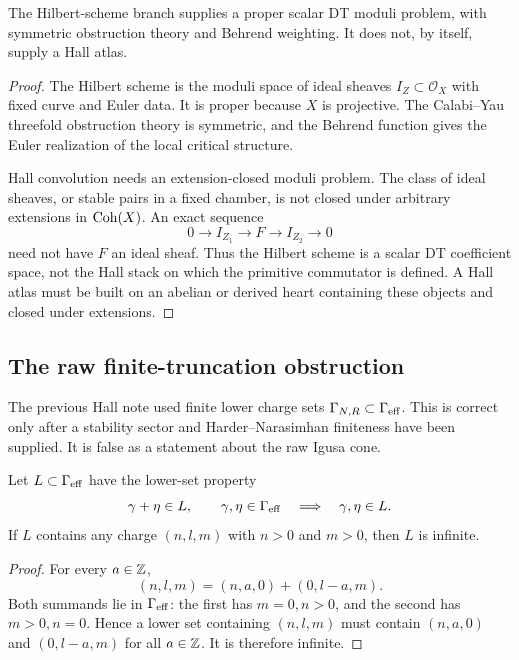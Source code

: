 \begin{proposition}
\label{prop:scalar-critical-geometry-only}
The Hilbert-scheme branch supplies a proper scalar DT moduli problem,
with symmetric obstruction theory and Behrend weighting.  It does not,
by itself, supply a Hall atlas.
\end{proposition}

\begin{proof}
The Hilbert scheme is the moduli space of ideal sheaves
\(I_Z\subset\mathcal O_X\) with fixed curve and Euler data.  It is
proper because \(X\) is projective.  The Calabi--Yau threefold
obstruction theory is symmetric, and the Behrend function gives the
Euler realization of the local critical structure.

Hall convolution needs an extension-closed moduli problem.  The class of
ideal sheaves, or stable pairs in a fixed chamber, is not closed under
arbitrary extensions in \(\operatorname{Coh}(X)\).  An exact sequence
\[
  0\longrightarrow I_{Z_1}\longrightarrow F\longrightarrow I_{Z_2}
  \longrightarrow 0
\]
need not have \(F\) an ideal sheaf.  Thus the Hilbert scheme is a scalar
DT coefficient space, not the Hall stack on which the primitive
commutator is defined.  A Hall atlas must be built on an abelian or
derived heart containing these objects and closed under extensions.
\end{proof}

\subsection{The raw finite-truncation obstruction}

The previous Hall note used finite lower charge sets
\(\Gamma_{N,R}\subset\Gamma_{\mathrm{eff}}\).  This is correct only after a stability
sector and Harder--Narasimhan finiteness have been supplied.  It is false
as a statement about the raw Igusa cone.

\begin{lemma}
\label{lem:no-raw-finite-lower-sets}
Let \(L\subset\Gamma_{\mathrm{eff}}\) have the lower-set property
\[
  \gamma+\eta\in L,\qquad \gamma,\eta\in\Gamma_{\mathrm{eff}}
  \quad\Longrightarrow\quad
  \gamma,\eta\in L .
\]
If \(L\) contains any charge \((n,l,m)\) with \(n>0\) and \(m>0\), then
\(L\) is infinite.
\end{lemma}

\begin{proof}
For every \(a\in\mathbb Z\),
\[
  (n,l,m)=(n,a,0)+(0,l-a,m).
\]
Both summands lie in \(\Gamma_{\mathrm{eff}}\): the first has \(m=0,n>0\), and the
second has \(m>0,n=0\).  Hence a lower set containing \((n,l,m)\) must
contain \((n,a,0)\) and \((0,l-a,m)\) for all \(a\in\mathbb Z\).  It is
therefore infinite.
\end{proof}


